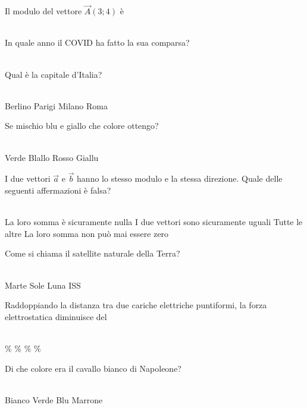 \documentclass[a4paper,11pt]{exam}
\begin{document}
\begin{questions}
    
\question Il modulo del vettore $\vec{A}(3;4)$ è\\\
\begin{oneparchoices}
\end{oneparchoices}

    
\question In quale anno il COVID ha fatto la sua comparsa?\\\
\begin{oneparchoices}
  \choice 2001
\end{oneparchoices}

    
\question Qual è la capitale d’Italia?\\\
\begin{oneparchoices}
  \choice Berlino
  \choice Parigi
  \choice Milano
  \choice Roma
\end{oneparchoices}

    
\question Se mischio blu e giallo che colore ottengo?\\\
\begin{oneparchoices}
  \choice Verde
  \choice Blallo
  \choice Rosso
  \choice Giallu
\end{oneparchoices}

    
\question I due vettori $\vec{a}$ e $\vec{b}$ hanno lo stesso modulo e la stessa direzione. Quale delle seguenti affermazioni è falsa?\\\
\begin{oneparchoices}
  \choice La loro somma è sicuramente nulla
  \choice I due vettori sono sicuramente uguali
  \choice Tutte le altre
  \choice La loro somma non può mai essere zero
\end{oneparchoices}

    
\question Come si chiama il satellite naturale della Terra?\\\
\begin{oneparchoices}
  \choice Marte
  \choice Sole
  \choice Luna
  \choice ISS
\end{oneparchoices}

    
\question Raddoppiando la distanza tra due cariche elettriche puntiformi, la forza elettrostatica diminuisce del\\\
\begin{oneparchoices}
  \choice 75\%
  \choice 25\%
  \choice 50\%
  \choice 90\%
\end{oneparchoices}

    
\question Di che colore era il cavallo bianco di Napoleone?\\\
\begin{oneparchoices}
  \choice Bianco
  \choice Verde
  \choice Blu 
  \choice Marrone
\end{oneparchoices}


\end{questions}
\end{document}
